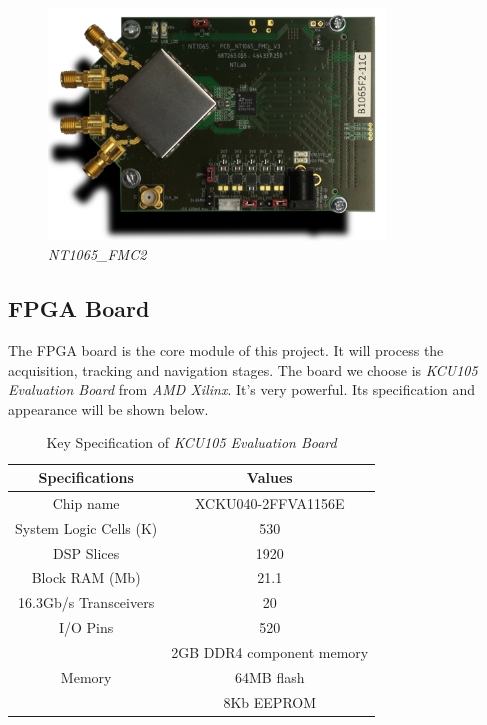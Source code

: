 \begin{figure}[!htbp]
    \centering
    \includegraphics[width=0.8\textwidth]{_IMAGES/fmc-2-nt1065.png}
    \caption{\textit{NT1065\_FMC2}}
    \label{fig:nt1065}
\end{figure}

\subsection{FPGA Board}
The FPGA board is the core module of this project. It will process the acquisition, tracking and navigation stages. The board we choose is \textit{KCU105 Evaluation Board} from \textit{AMD Xilinx}. It's very powerful. Its specification and appearance will be shown below.

\begin{table}[!htbp]
\centering
\caption{Key Specification of \textit{KCU105 Evaluation Board}}
\label{tab:kcu105}
\renewcommand\arraystretch{1.5}
\begin{tabular}{cc}
    \toprule
    Specifications & Values \\
    \midrule
    Chip name & XCKU040-2FFVA1156E \\
    System Logic Cells (K) & 530 \\
    DSP Slices & \num{1920} \\
    Block RAM (Mb) & 21.1 \\
    16.3Gb/s Transceivers & 20 \\
    I/O Pins & 520 \\
    \multirow{3}{*}{Memory} & 2GB DDR4 component memory \\
     & 64MB flash \\
     & 8Kb EEPROM \\
     \bottomrule
\end{tabular}
\end{table}

